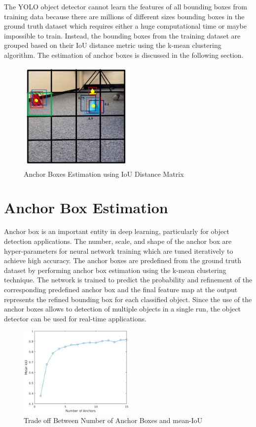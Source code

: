 The YOLO object detector cannot learn the features of all bounding boxes from training data because there are millions of different sizes bounding boxes in the ground truth dataset which requires either a huge computational time or maybe impossible to train. Instead, the bounding boxes from the training dataset are grouped based on their IoU distance metric using the k-mean clustering algorithm. The estimation of anchor boxes is discussed in the following section.

\begin{figure}
    \centering
    \includegraphics[width=0.5\textwidth]{Images/IOU.png}
    \caption{Anchor Boxes Estimation using IoU Distance Matrix}
    \label{IOU}
\end{figure} 

\section{Anchor Box Estimation}
Anchor box is an important entity in deep learning, particularly for object detection applications. The number, scale, and shape of the anchor box are hyper-parameters for neural network training which are tuned iteratively to achieve high accuracy. The anchor boxes are predefined from the ground truth dataset by performing anchor box estimation using the k-mean clustering technique. The network is trained to predict the probability and refinement of the corresponding predefined anchor box and the final feature map at the output represents the refined bounding box for each classified object. Since the use of the anchor boxes allows to detection of multiple objects in a single run, the object detector can be used for real-time applications. 

\begin{figure}
    \centering
    \includegraphics[width=0.5\textwidth]{Images/imperical.png}
    \caption{Trade off Between Number of Anchor Boxes and mean-IoU \cite{YOLO9000}}
    \label{imperical}
\end{figure}

